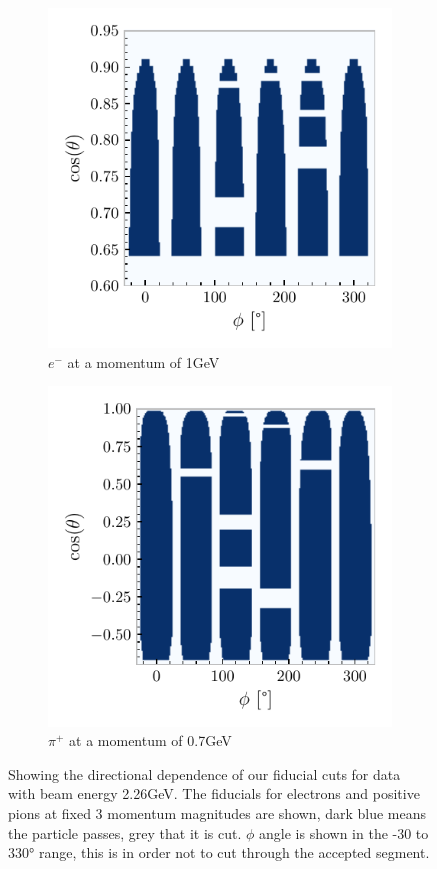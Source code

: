 \documentclass[a4paper,12pt]{article}
\begin{document}
\begin{figure}[H]
    \centering
    \begin{subfigure}[b]{0.45\textwidth}
        \centering
        \includegraphics{figures/python/el_fid.pdf}
        \caption{$e^-$ at a momentum of 1\si{GeV}}
    \end{subfigure}
    \hspace{0.5em}
    \begin{subfigure}[b]{0.45\textwidth}
        \centering
        \includegraphics{figures/python/pip_fid.pdf}
        \caption{$\pi^+$ at a momentum of 0.7\si{GeV}}
    \end{subfigure}
    \caption{
        Showing the directional dependence of our fiducial cuts for data with beam energy 2.26\si{GeV}.
        The fiducials for electrons and positive pions at fixed 3 momentum magnitudes are shown, dark blue means the particle passes, grey that it is cut.
        $\phi$ angle is shown in the -30 to 330\si{\degree} range, this is in order not to cut through the accepted segment.
    }\label{fig:fid_map}
\end{figure}
\end{document}
